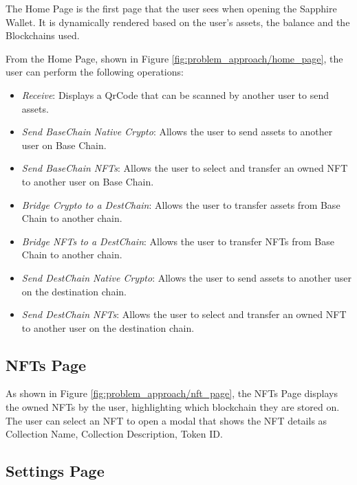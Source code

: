 
The Home Page is the first page that the user sees when opening the Sapphire Wallet. It is dynamically rendered based on the user's assets, the balance and the Blockchains used.

From the Home Page, shown in Figure \ref{fig:problem_approach/home_page}, the user can perform the following operations:
\begin{itemize}
    \item \textit{Receive}: Displays a QrCode that can be scanned by another user to send assets.
    \item \textit{Send BaseChain Native Crypto}: Allows the user to send assets to another user on Base Chain.
    \item \textit{Send BaseChain NFTs}: Allows the user to select and transfer an owned NFT to another user on Base Chain.
    \item \textit{Bridge Crypto to a DestChain}: Allows the user to transfer assets from Base Chain to another chain.
    \item \textit{Bridge NFTs to a DestChain}: Allows the user to transfer NFTs from Base Chain to another chain.
    \item \textit{Send DestChain Native Crypto}: Allows the user to send assets to another user on the destination chain.
    \item \textit{Send DestChain NFTs}: Allows the user to select and transfer an owned NFT to another user on the destination chain.
\end{itemize}



\subsection{NFTs Page}
\label{subsec:nfts_page}

As shown in Figure \ref{fig:problem_approach/nft_page}, the NFTs Page displays the owned NFTs by the user, highlighting which blockchain they are stored on. The user can select an NFT to open a modal that shows the NFT details as Collection Name, Collection Description, Token ID. 


\subsection{Settings Page}
\label{subsec:settings_page}

